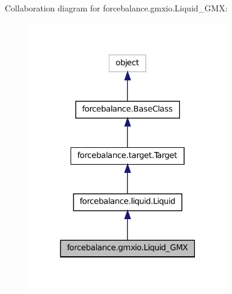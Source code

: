 Collaboration diagram for forcebalance.\-gmxio.\-Liquid\-\_\-\-G\-M\-X\-:\nopagebreak
\begin{figure}[H]
\begin{center}
\leavevmode
\includegraphics[width=248pt]{classforcebalance_1_1gmxio_1_1Liquid__GMX__coll__graph}
\end{center}
\end{figure}
